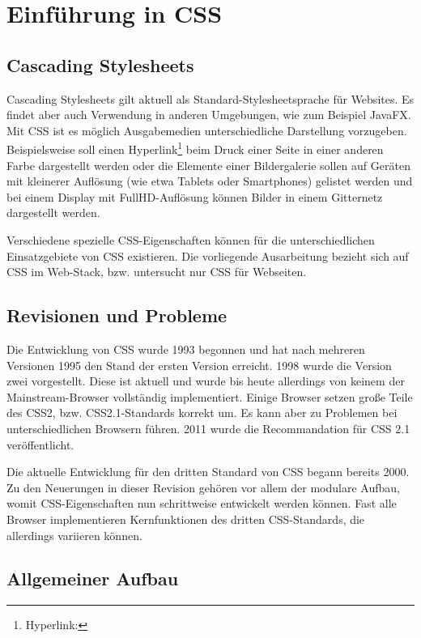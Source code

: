\section{Einführung in CSS}
\subsection{Cascading Stylesheets}

Cascading Stylesheets gilt aktuell als Standard-Stylesheetsprache für Websites. Es findet aber auch Verwendung in anderen Umgebungen, wie zum Beispiel JavaFX. Mit CSS ist es möglich Ausgabemedien unterschiedliche Darstellung vorzugeben. Beispielsweise soll einen Hyperlink\footnote{Hyperlink:} beim Druck einer Seite in einer anderen Farbe dargestellt werden oder die Elemente einer Bildergalerie sollen auf Geräten mit kleinerer Auflösung (wie etwa Tablets oder Smartphones) gelistet werden und bei einem Display mit FullHD-Auflösung können Bilder in einem Gitternetz dargestellt werden. 

Verschiedene spezielle CSS-Eigenschaften können für die unterschiedlichen Einsatzgebiete von CSS existieren. Die vorliegende Ausarbeitung bezieht sich auf CSS im Web-Stack, bzw. untersucht nur CSS für Webseiten. 

\subsection{Revisionen und Probleme}
Die Entwicklung von CSS wurde 1993 begonnen und hat nach mehreren Versionen 1995 den Stand der ersten Version erreicht. 1998 wurde die Version zwei vorgestellt. Diese ist aktuell und wurde bis heute allerdings von keinem der Mainstream-Browser vollständig implementiert. Einige Browser setzen große Teile des CSS2, bzw. CSS2.1-Standards korrekt um. Es kann aber zu Problemen bei unterschiedlichen Browsern führen. 2011 wurde die Recommandation für CSS 2.1 veröffentlicht. 

Die aktuelle Entwicklung für den dritten Standard von CSS begann bereits 2000. Zu den Neuerungen in dieser Revision gehören vor allem der modulare Aufbau, womit CSS-Eigenschaften nun schrittweise entwickelt werden können. Fast alle Browser implementieren Kernfunktionen des dritten CSS-Standards, die allerdings variieren können. 

\subsection{Allgemeiner Aufbau}

